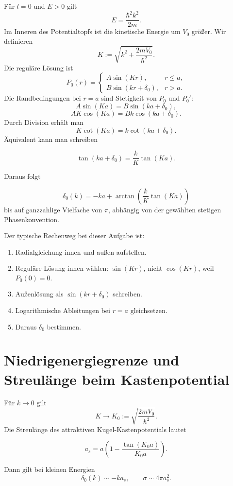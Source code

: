Für \(l=0\) und \(E>0\) gilt
\[
    E=\frac{\hbar^2k^2}{2m}.
\]
Im Inneren des Potentialtopfs ist die kinetische Energie um \(V_0\) größer. Wir definieren
\[
    K:=\sqrt{k^2+\frac{2mV_0}{\hbar^2}}.
\]
Die reguläre Lösung ist
\[
    P_0(r)=
    \begin{cases}
        A\sin(Kr), & r\le a,\\
        B\sin(kr+\delta_0), & r>a.
    \end{cases}
\]
Die Randbedingungen bei \(r=a\) sind Stetigkeit von \(P_0\) und \(P_0'\):
\[
    A\sin(Ka)=B\sin(ka+\delta_0),
\]
\[
    AK\cos(Ka)=Bk\cos(ka+\delta_0).
\]
Durch Division erhält man
\[
    K\cot(Ka)=k\cot(ka+\delta_0).
\]
Äquivalent kann man schreiben
\begin{formulabox}
\[
    \tan(ka+\delta_0)=\frac{k}{K}\tan(Ka).
\]
\end{formulabox}
Daraus folgt
\begin{formulabox}
\[
    \delta_0(k)=-ka+\arctan\left(\frac{k}{K}\tan(Ka)\right)
\]
bis auf ganzzahlige Vielfache von \(\pi\), abhängig von der gewählten stetigen Phasenkonvention.
\end{formulabox}

\begin{examtipbox}
Der typische Rechenweg bei dieser Aufgabe ist:
\begin{enumerate}
    \item Radialgleichung innen und außen aufstellen.
    \item Reguläre Lösung innen wählen: \(\sin(Kr)\), nicht \(\cos(Kr)\), weil \(P_0(0)=0\).
    \item Außenlösung als \(\sin(kr+\delta_0)\) schreiben.
    \item Logarithmische Ableitungen bei \(r=a\) gleichsetzen.
    \item Daraus \(\delta_0\) bestimmen.
\end{enumerate}
\end{examtipbox}

\section{Niedrigenergiegrenze und Streulänge beim Kastenpotential}

Für \(k\to 0\) gilt
\[
    K\to K_0:=\sqrt{\frac{2mV_0}{\hbar^2}}.
\]
Die Streulänge des attraktiven Kugel-Kastenpotentials lautet
\begin{formulabox}
\[
    a_s=a\left(1-\frac{\tan(K_0a)}{K_0a}\right).
\]
\end{formulabox}
Dann gilt bei kleinen Energien
\[
    \delta_0(k)\sim -ka_s,
    \qquad
    \sigma\sim 4\pi a_s^2.
\]

